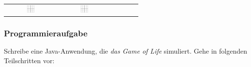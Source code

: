 \begin{tabular}{cccccc}
\includegraphics[width=0.15\textwidth]{./inf/SEKII/18_Java_Arrays/GoL.png} &
\includegraphics[width=0.15\textwidth]{./inf/SEKII/18_Java_Arrays/GoL.png} \\
\end{tabular}

\subsubsection{Programmieraufgabe}

Schreibe eine Java-Anwendung, die \emph{das Game of Life} simuliert. Gehe in
folgenden Teilschritten vor:

